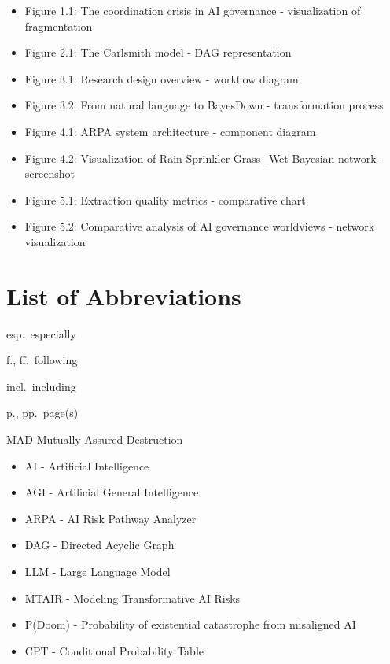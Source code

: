 \documentclass[
  11pt,
  letterpaper,
]{book}
\providecommand{\tightlist}{%
  \setlength{\itemsep}{0pt}\setlength{\parskip}{0pt}}
\begin{document}
\begin{itemize}
\tightlist
\item
  Figure 1.1: The coordination crisis in AI governance - visualization
  of fragmentation\\
\item
  Figure 2.1: The Carlsmith model - DAG representation\\
\item
  Figure 3.1: Research design overview - workflow diagram\\
\item
  Figure 3.2: From natural language to BayesDown - transformation
  process\\
\item
  Figure 4.1: ARPA system architecture - component diagram\\
\item
  Figure 4.2: Visualization of Rain-Sprinkler-Grass\_Wet Bayesian
  network - screenshot\\
\item
  Figure 5.1: Extraction quality metrics - comparative chart\\
\item
  Figure 5.2: Comparative analysis of AI governance worldviews - network
  visualization
\end{itemize}

\section*{List of Abbreviations}\label{list-of-abbreviations}


esp.~especially

f., ff.~following

incl.~including

p., pp.~page(s)

MAD Mutually Assured Destruction

\begin{itemize}
\tightlist
\item
  AI - Artificial Intelligence\\
\item
  AGI - Artificial General Intelligence\\
\item
  ARPA - AI Risk Pathway Analyzer\\
\item
  DAG - Directed Acyclic Graph\\
\item
  LLM - Large Language Model\\
\item
  MTAIR - Modeling Transformative AI Risks\\
\item
  P(Doom) - Probability of existential catastrophe from misaligned AI\\
\item
  CPT - Conditional Probability Table
\end{itemize}
\end{document}
